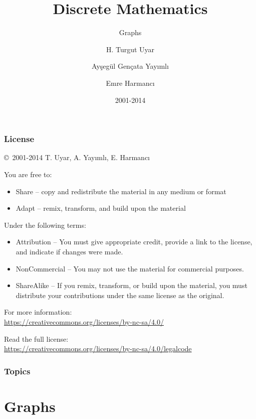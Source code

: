 \documentclass[dvipsnames]{beamer}
\title{Discrete Mathematics}
\subtitle{Graphs}
\author{H. Turgut Uyar \and Ayşegül Gençata Yayımlı \and Emre Harmancı}
\date{2001-2014}
\begin{document}
\begin{frame}
  \titlepage
\end{frame}

\begin{frame}
  \frametitle{License}

  \hfill
  \copyright~2001-2014 T. Uyar, A. Yayımlı, E. Harmancı

  \vfill
  \begin{footnotesize}
    You are free to:
    \begin{itemize}
      \itemsep0em
      \item Share -- copy and redistribute the material in any medium or format
      \item Adapt -- remix, transform, and build upon the material
    \end{itemize}

    Under the following terms:
    \begin{itemize}
      \itemsep0em
      \item Attribution -- You must give appropriate credit, provide a link to
        the license, and indicate if changes were made.

      \item NonCommercial -- You may not use the material for commercial
        purposes.

      \item ShareAlike -- If you remix, transform, or build upon the material,
        you must distribute your contributions under the same license as the
        original.
    \end{itemize}
  \end{footnotesize}

  \begin{small}
    For more information:\\
    \url{https://creativecommons.org/licenses/by-nc-sa/4.0/}

    \smallskip
    Read the full license:\\
    \url{https://creativecommons.org/licenses/by-nc-sa/4.0/legalcode}
  \end{small}
\end{frame}

\begin{frame}
  \frametitle{Topics}
  \tableofcontents
\end{frame}

\section{Graphs}
\end{document}
